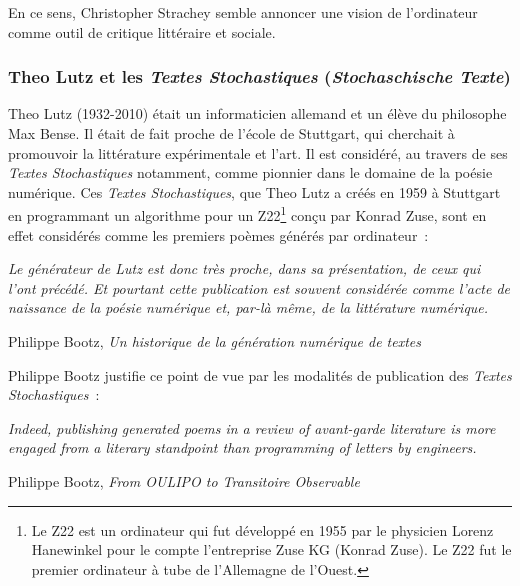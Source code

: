 \documentclass{article}
\newenvironment{citationbox}
{\begin{center}
		\begin{minipage}{.8\textwidth}
		}
		{
		\end{minipage}	
\end{center}
}
\begin{document}
				En ce sens, Christopher Strachey semble annoncer une vision de l'ordinateur comme outil de critique littéraire et sociale.
		
			\subsubsection{Theo Lutz et les \textit{Textes Stochastiques} (\textit{Stochaschische Texte})}
				Theo Lutz (1932-2010) était un informaticien allemand et un élève du philosophe Max Bense. Il était de fait proche de l'école de Stuttgart, qui cherchait à promouvoir la littérature expérimentale et l'art.  Il  est considéré, au travers de ses \textit{Textes Stochastiques} notamment, comme pionnier dans le domaine de la poésie numérique. Ces \textit{Textes Stochastiques}, que Theo Lutz a créés en 1959 à Stuttgart en programmant un algorithme pour un Z22\footnote{Le Z22 est un ordinateur qui fut développé en 1955 par le physicien Lorenz Hanewinkel pour le compte l'entreprise Zuse KG (Konrad Zuse). Le Z22 fut le premier ordinateur à tube de l'Allemagne de l'Ouest.} conçu par Konrad Zuse, sont en effet considérés comme les premiers poèmes générés par ordinateur :
				\begin{citationbox}
					\textit{Le générateur de Lutz est donc très proche, dans sa présentation, de ceux qui l'ont précédé. Et pourtant cette publication est souvent considérée comme l'acte de naissance de la poésie numérique et, par-là même, de la littérature numérique.}
					\begin{flushright}
						Philippe Bootz, \textit{Un historique de la génération numérique de textes}\autocite{bootz}
					\end{flushright}
				\end{citationbox}
				Philippe Bootz justifie ce point de vue par les modalités de publication des \textit{Textes Stochastiques}~:
				
				\begin{citationbox}
					\textit{Indeed, publishing generated poems in a review of avant-garde literature is more engaged from a literary standpoint than programming of letters by engineers.}
					\begin{flushright}
						Philippe Bootz, \textit{From OULIPO to Transitoire Observable} \autocite{bootz2012}
					\end{flushright}
				\end{citationbox}
				
\end{document}

